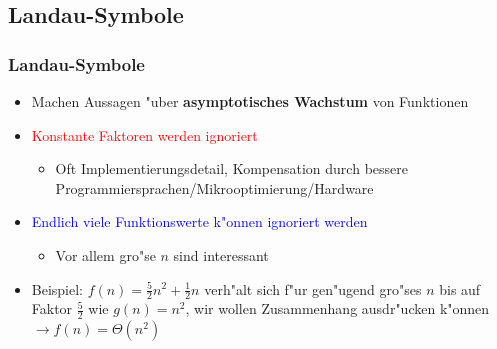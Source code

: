 \subsection{Landau-Symbole}
\begin{frame}
  \frametitle{Landau-Symbole}
  \begin{itemize}
  \item Machen Aussagen "uber \textbf{asymptotisches Wachstum} von Funktionen
  \item \textcolor{red}{Konstante Faktoren werden ignoriert}
    \begin{itemize}
    \item Oft Implementierungsdetail, Kompensation durch
          bessere Programmiersprachen/Mikrooptimierung/Hardware
    \end{itemize}
  \item \textcolor{blue}{Endlich viele Funktionswerte k"onnen ignoriert werden}
    \begin{itemize}
    \item Vor allem gro"se $n$ sind interessant
    \end{itemize}
  \item Beispiel: $f(n) = \frac{5}{2}n^2 + \frac{1}{2}n$ verh"alt sich f"ur gen"ugend gro"ses
        $n$ bis auf Faktor $\frac{5}{2}$ wie $g(n) = n^2$, wir wollen
        Zusammenhang ausdr"ucken k"onnen \\[1em]
          $\rightarrow f(n) = \Theta(n^2)$
  \end{itemize}
\end{frame}

